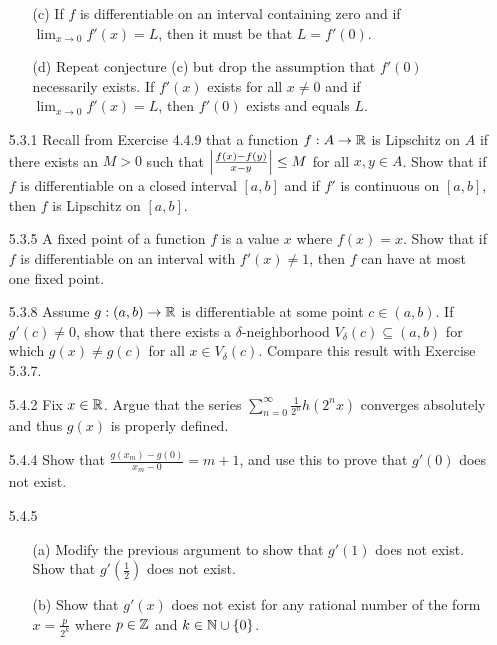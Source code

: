\documentclass[12pt,letterpaper]{article}
\begin{document}
\begin{itemize}[leftmargin=!,labelindent=5pt]
\begin{itemize}
                \item [(c)] If $f$ is differentiable on an interval containing zero and if $\lim_{x\to 0} f'(x) = L$, then it must be that $L = f'(0)$.
                \item [(d)] Repeat conjecture (c) but drop the assumption that $f'(0)$ necessarily exists. If $f'(x)$ exists for all $x \neq 0$ and if $\lim_{x \to 0} f'(x) = L$, then $f'(0)$ exists and equals $L$.
            \end{itemize}
        \item [5.3.1] Recall from Exercise 4.4.9 that a function $f : A \to \mathbb{R}$ is Lipschitz on $A$ if there exists an $M > 0$ such that $\abs{\frac{f(x) - f(y)}{x-y}} \leq M$ for all $x,y \in A$. Show that if $f$ is differentiable on a closed interval $[a, b]$ and if $f'$ is continuous on $[a,b]$, then $f$ is Lipschitz on $[a,b]$.
        \item [5.3.5] A fixed point of a function $f$ is a value $x$ where $f(x) = x$. Show that if $f$ is differentiable on an interval with $f'(x) \neq 1$, then $f$ can have at most one fixed point.
        \item [5.3.8] Assume $g:(a,b) \to \mathbb{R}$ is differentiable at some point $c \in (a,b)$. If $g'(c) \neq 0$, show that there exists a $\delta$-neighborhood $V_\delta(c) \subseteq (a,b)$ for which $g(x) \neq g(c)$ for all $x \in V_\delta(c)$. Compare this result with Exercise 5.3.7.
        \item [5.4.2] Fix $x \in \mathbb{R}$. Argue that the series $\sum_{n=0}^{\infty} \frac{1}{2^n}h(2^n x)$ converges absolutely and thus $g(x)$ is properly defined.
        \item [5.4.4] Show that $\frac{g(x_m) - g(0)}{x_m - 0} = m+1$, and use this to prove that $g'(0)$ does not exist.
        \item [5.4.5] 
            \begin{itemize}
                \item [(a)] Modify the previous argument to show that $g'(1)$ does not exist. Show that $g'(\frac{1}{2})$ does not exist.
                \item [(b)] Show that $g'(x)$ does not exist for any rational number of the form $x = \frac{p}{2^k}$ where $p \in \mathbb{Z}$ and $k \in \mathbb{N} \cup \{0\}$.
            \end{itemize}
    \end{itemize}
\end{document}
